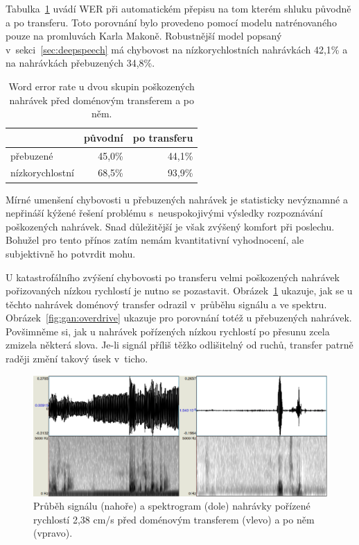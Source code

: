 Tabulka~\ref{tab:ganeval} uvádí WER při automatickém přepisu na tom kterém
shluku původně a po transferu. Toto porovnání bylo provedeno pomocí modelu
natrénovaného pouze na promluvách Karla Makoně. Robustnější model popsaný
v~sekci~\ref{sec:deepspeech} má chybovost na nízkorychlostních nahrávkách
42,1\% %
a na nahrávkách přebuzených 34,8\%. %

\begin{table}[htpb]
\begin{center}
\begin{tabular}{|l||r|r|}
\hline
                 & původní & po transferu \\
\hline
přebuzené        & 45,0\%  & 44,1\% \\
nízkorychlostní  & 68,5\%  & 93,9\% \\
\hline
\end{tabular}
\caption{Word error rate u dvou skupin poškozených nahrávek před doménovým
transferem a po něm.}\label{tab:ganeval}
\end{center}
\end{table}

Mírné umenšení chybovosti u přebuzených nahrávek je statisticky nevýznamné a
nepřináší kýžené řešení problému s~neuspokojivými výsledky rozpoznávání
poškozených nahrávek. Snad důležitější je však zvýšený komfort při
poslechu. Bohužel pro tento přínos zatím nemám kvantitativní vyhodnocení, ale
subjektivně ho potvrdit mohu.

U katastrofálního zvýšení chybovosti po transferu velmi poškozených nahrávek
pořizovaných nízkou rychlostí je nutno se pozastavit.
Obrázek~\ref{fig:gan:plzen} ukazuje, jak se u těchto nahrávek doménový transfer
odrazil v~průběhu signálu a ve spektru. Obrázek~\ref{fig:gan:overdrive} ukazuje
pro porovnání totéž u přebuzených nahrávek. Povšimněme si, jak u nahrávek
pořízených nízkou rychlostí po přesunu zcela zmizela některá slova. Je-li signál
příliš těžko odlišitelný od ruchů, transfer patrně raději změní takový úsek
v~ticho.

\begin{figure}[htpb]
\includegraphics[scale=0.4]{rc/gan-plzen.eps}
\caption{Průběh signálu (nahoře) a spektrogram (dole) nahrávky pořízené
rychlostí 2,38 cm/s před doménovým transferem (vlevo) a po něm (vpravo).}
\label{fig:gan:plzen}
\end{figure}

